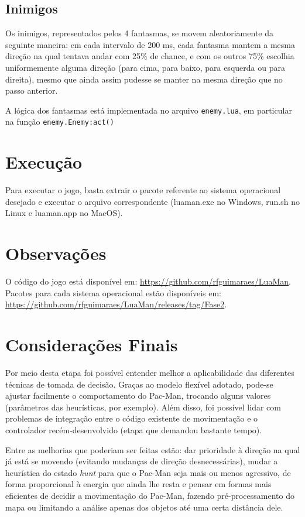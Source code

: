 \documentclass[a4paper]{scrartcl}
\begin{document}
\subsection{Inimigos}

Os inimigos, representados pelos 4 fantasmas, se movem aleatoriamente da seguinte maneira: em cada
intervalo de 200 ms,
cada fantasma mantem a mesma direção na qual tentava andar com 25\% de chance, e com os outros 75\%
escolhia uniformemente alguma direção (para cima, para baixo, para esquerda ou para direita), mesmo
que ainda assim pudesse se manter na mesma direção que no passo anterior.

A lógica dos fantasmas está implementada no arquivo \texttt{enemy.lua}, em particular na função
\texttt{enemy.Enemy:act()}

\section{Execução}

Para executar o jogo, basta extrair o pacote referente ao sistema operacional desejado e executar o
arquivo correspondente (luaman.exe no Windows, run.sh no Linux e luaman.app no MacOS).

\section{Observações}

O código do jogo está disponível em: \url{https://github.com/rfguimaraes/LuaMan}.
Pacotes para cada sistema operacional estão disponíveis em: \url{https://github.com/rfguimaraes/LuaMan/releases/tag/Fase2}.

\section{Considerações Finais}

Por meio desta etapa foi possível entender melhor a aplicabilidade das diferentes técnicas de
tomada de decisão. Graças ao modelo flexível adotado, pode-se ajustar facilmente o comportamento
do Pac-Man, trocando alguns valores (parâmetros das heurísticas, por exemplo).
Além disso, foi possível lidar com problemas de integração entre o código existente de movimentação
e o controlador recém-desenvolvido (etapa que demandou bastante tempo).

Entre as melhorias que poderiam ser feitas estão: dar prioridade à direção na qual já está se movendo
(evitando mudanças de direção desnecessárias), mudar a heurística do estado \textit{hunt} para que o Pac-Man seja mais ou menos agressivo, de forma proporcional à energia que ainda lhe resta e pensar
em formas mais eficientes de decidir a movimentação do Pac-Man, fazendo pré-processamento do mapa
ou limitando a análise apenas dos objetos até uma certa distância dele.
\end{document}
